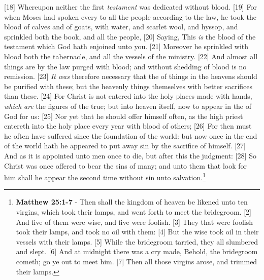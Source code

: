 [18] \textcolor[cmyk]{0.99998,1,0,0}{Whereupon neither the first \emph{testament} was dedicated without blood.}
[19] \textcolor[cmyk]{0.99998,1,0,0}{For when Moses had spoken every  to all the people according to the law, he took the blood of calves and of goats, with water, and scarlet wool, and hyssop, and sprinkled both the book, and all the people,}
[20] \textcolor[cmyk]{0.99998,1,0,0}{Saying, This \emph{is} the blood of the testament which God hath enjoined unto you.}
[21] \textcolor[cmyk]{0.99998,1,0,0}{Moreover he sprinkled with blood both the tabernacle, and all the vessels of the ministry.}
[22] \textcolor[cmyk]{0.99998,1,0,0}{And almost all things are by the law purged with blood; and without shedding of blood is no remission.}
[23] \textcolor[cmyk]{0.99998,1,0,0}{\emph{It} \emph{was} therefore necessary that the  of things in the heavens should be purified with these; but the heavenly things themselves with better sacrifices than these.}
[24] \textcolor[cmyk]{0.99998,1,0,0}{For Christ is not entered into the holy places made with hands, \emph{which} \emph{are} the figures of the true; but into heaven itself, now to appear in the  of God for us:}
[25] \textcolor[cmyk]{0.99998,1,0,0}{Nor yet that he should offer himself often, as the high priest entereth into the holy place every year with blood of others;}
[26] \textcolor[cmyk]{0.99998,1,0,0}{For then must he often have suffered since the foundation of the world: but now once in the end of the world hath he appeared to put away sin by the sacrifice of himself.}
[27] \textcolor[cmyk]{0.99998,1,0,0}{And as it is appointed unto men once to die, but after this the judgment:}
[28] \textcolor[cmyk]{0.99998,1,0,0}{So Christ was once offered to bear the sins of many; and unto them that look for him shall he appear the second time without sin unto salvation.}\footnote{\textbf{Matthew 25:1-7} - Then shall the kingdom of heaven be likened unto ten virgins, which took their lamps, and went forth to meet the bridegroom. [2] And five of them were wise, and five were foolish. [3] They that were foolish took their lamps, and took no oil with them: [4] But the wise took oil in their vessels with their lamps. [5] While the bridegroom tarried, they all slumbered and slept. [6] And at midnight there was a cry made, Behold, the bridegroom cometh; go ye out to meet him. [7] Then all those virgins arose, and trimmed their lamps.}